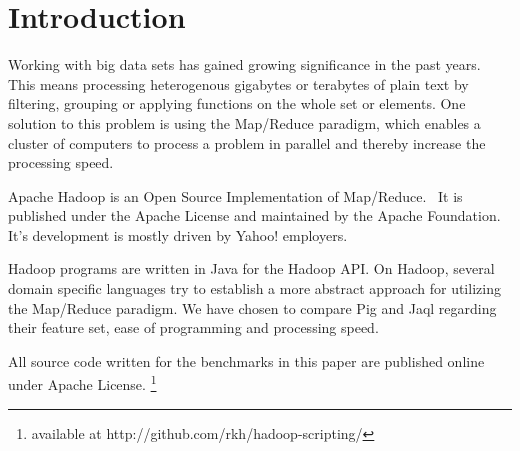 \section{Introduction}

Working with big data sets has gained growing significance in the past years. This means processing heterogenous gigabytes or terabytes of plain text by filtering, grouping or applying functions on the whole set or elements. One solution to this problem is using the Map/Reduce paradigm, which enables a cluster of computers to process a problem in parallel and thereby increase the processing speed.

Apache Hadoop is an Open Source Implementation of Map/Reduce.~\cite{hadoopWebsite} It is published under the Apache License and maintained by the Apache Foundation. It's development is mostly driven by Yahoo! employers.

Hadoop programs are written in Java for the Hadoop API. On Hadoop, several domain specific languages try to establish a more abstract approach for utilizing the Map/Reduce paradigm. We have chosen to compare Pig and Jaql regarding their feature set, ease of programming and processing speed.

All source code written for the benchmarks in this paper are published online under Apache License. \footnote{available at http://github.com/rkh/hadoop-scripting/}